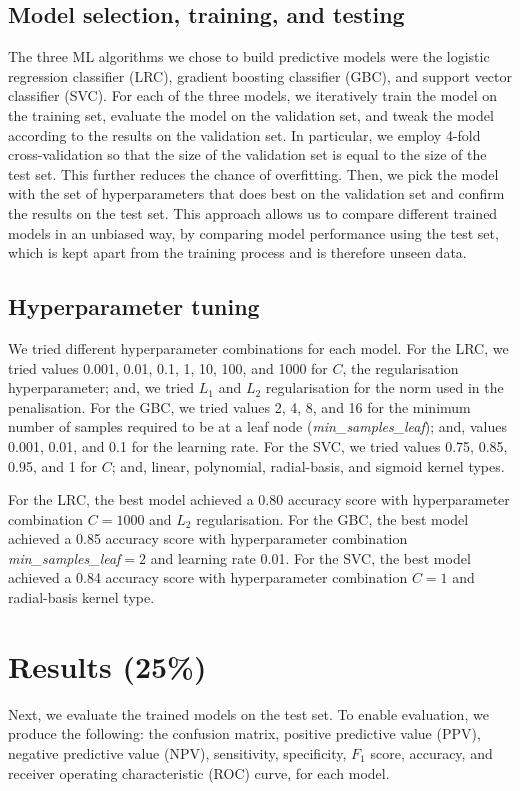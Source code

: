 \documentclass[twoside,11pt]{article}
\begin{document}
\subsection{Model selection, training, and testing}
The three ML algorithms we chose to build predictive models were the logistic regression classifier (LRC), gradient boosting classifier (GBC), and support vector classifier (SVC). For each of the three models, we iteratively train the model on the training set, evaluate the model on the validation set, and tweak the model according to the results on the validation set. In particular, we employ 4-fold cross-validation so that the size of the validation set is equal to the size of the test set. This further reduces the chance of overfitting. Then, we pick the model with the set of hyperparameters that does best on the validation set and confirm the results on the test set. This approach allows us to compare different trained models in an unbiased way, by comparing model performance using the test set, which is kept apart from the training process and is therefore unseen data.

\subsection{Hyperparameter tuning}
We tried different hyperparameter combinations for each model. For the LRC, we tried values 0.001, 0.01, 0.1, 1, 10, 100, and 1000 for $C$, the regularisation hyperparameter; and, we tried $L_1$ and $L_2$ regularisation for the norm used in the penalisation. For the GBC, we tried values 2, 4, 8, and 16 for the minimum number of samples required to be at a leaf node (\emph{min\_samples\_leaf}); and, values 0.001, 0.01, and 0.1 for the learning rate. For the SVC, we tried values 0.75, 0.85, 0.95, and 1 for $C$; and, linear, polynomial, radial-basis, and sigmoid kernel types. 

For the LRC, the best model achieved a 0.80 accuracy score with hyperparameter combination $C=1000$ and $L_2$ regularisation. For the GBC, the best model achieved a 0.85 accuracy score with hyperparameter combination \emph{min\_samples\_leaf}$=2$ and learning rate 0.01. For the SVC, the best model achieved a 0.84 accuracy score with hyperparameter combination $C=1$ and radial-basis kernel type. 

\section{Results (25\%)}
Next, we evaluate the trained models on the test set. To enable evaluation, we produce the following: the confusion matrix, positive predictive value (PPV), negative predictive value (NPV), sensitivity, specificity, $F_1$ score, accuracy, and receiver operating characteristic (ROC) curve, for each model.
\end{document}
